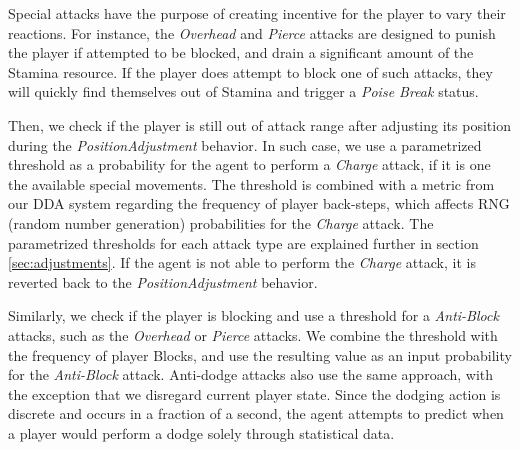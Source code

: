 Special attacks have the purpose of creating incentive for the player to vary their reactions. For instance, the \emph{Overhead} and \emph{Pierce} attacks are designed to punish the player if attempted to be blocked, and drain a significant amount of the Stamina resource. If the player does attempt to block one of such attacks, they will quickly find themselves out of Stamina and trigger a \emph{Poise Break} status.

Then, we check if the player is still out of attack range after adjusting its position during the \emph{PositionAdjustment} behavior. In such case, we use a parametrized threshold as a probability for the agent to perform a \emph{Charge} attack, if it is one the available special movements. The threshold is combined with a metric from our DDA system regarding the frequency of player back-steps, which affects RNG (random number generation) probabilities for the \emph{Charge} attack. The parametrized thresholds for each attack type are explained further in section \ref{sec:adjustments}. If the agent is not able to perform the \emph{Charge} attack, it is reverted back to the \emph{PositionAdjustment} behavior.

Similarly, we check if the player is blocking and use a threshold for  a \emph{Anti-Block} attacks, such as the \emph{Overhead} or \emph{Pierce} attacks. We combine the threshold with the frequency of player Blocks, and use the resulting value as an input probability for the \emph{Anti-Block} attack. Anti-dodge attacks also use the same approach, with the exception that we disregard current player state. Since the dodging action is discrete and occurs in a fraction of a second, the agent attempts to predict when a player would perform a dodge solely through statistical data.




